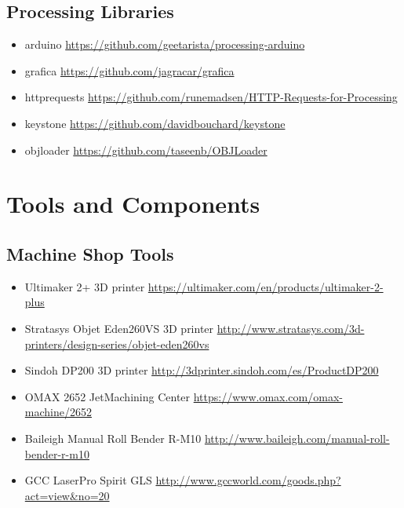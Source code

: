 \subsection{Processing Libraries}
\begin{itemize}
	\begin{itemize} \itemsep -10pt
	\item arduino \url{https://github.com/geetarista/processing-arduino}
	\item grafica  \url{https://github.com/jagracar/grafica}
	\item httprequests \url{https://github.com/runemadsen/HTTP-Requests-for-Processing}
	\item keystone \url{https://github.com/davidbouchard/keystone}
	\item objloader   \url{https://github.com/taseenb/OBJLoader}
	\end{itemize}
\end{itemize}
\section{Tools and Components}
\subsection{Machine Shop Tools}
\begin{itemize}
	\begin{itemize} \itemsep -10pt
	\item Ultimaker 2+ 3D printer \url{https://ultimaker.com/en/products/ultimaker-2-plus}
	\item Stratasys Objet Eden260VS 3D printer \url{http://www.stratasys.com/3d-printers/design-series/objet-eden260vs}
	\item Sindoh DP200 3D printer \url{http://3dprinter.sindoh.com/es/ProductDP200}
	\item OMAX 2652 JetMachining Center \url{https://www.omax.com/omax-machine/2652}
	\item Baileigh Manual Roll Bender R-M10 \url{http://www.baileigh.com/manual-roll-bender-r-m10}
	\item GCC LaserPro Spirit GLS \url{http://www.gccworld.com/goods.php?act=view&no=20}
	\end{itemize}
\end{itemize}

